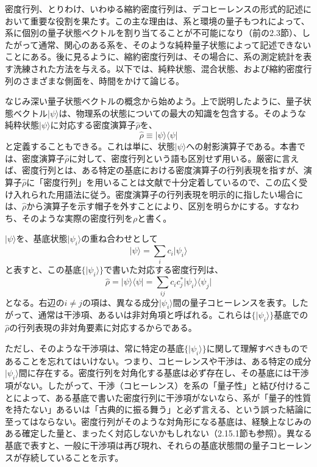 密度行列、とりわけ、いわゆる縮約密度行列は、デコヒーレンスの形式的記述において重要な役割を果たす。この主な理由は、系と環境の量子もつれによって、系に個別の量子状態ベクトルを割り当てることが不可能になり（前の2.3節）、したがって通常、関心のある系を、そのような純粋量子状態によって記述できないことにある。後に見るように、縮約密度行列は、その場合に、系の測定統計を表す洗練された方法を与える。以下では、純粋状態、混合状態、および縮約密度行列のさまざまな側面を、時間をかけて論じる。

\hypertarget{srcpage:34}{}\label{srcpage:34}
なじみ深い量子状態ベクトルの概念から始めよう。上で説明したように、量子状態ベクトル$\lvert\psi\rangle$は、物理系の状態についての最大の知識を包含する。そのような純粋状態$\lvert\psi\rangle$に対応する密度演算子$\hat\rho$を、
\begin{equation}\hat\rho\equiv\lvert\psi\rangle\langle\psi\rvert\tag{2.11}\end{equation}
と定義することもできる。これは単に、状態$\lvert\psi\rangle$への射影演算子である。本書では、密度演算子$\hat\rho$に対して、密度行列という語も区別せず用いる。厳密に言えば、密度行列とは、ある特定の基底における密度演算子の行列表現を指すが、演算子$\hat\rho$に「密度行列」を用いることは文献で十分定着しているので、この広く受け入れられた用語法に従う。密度演算子の行列表現を明示的に指したい場合には、$\hat\rho$から演算子を示す帽子を外すことにより、区別を明らかにする。すなわち、そのような実際の密度行列を$\rho$と書く。

$\lvert\psi\rangle$を、基底状態$\lvert\psi_i\rangle$の重ね合わせとして
\begin{equation}\lvert\psi\rangle=\sum_i c_i\lvert\psi_i\rangle\tag{2.12}\end{equation}
と表すと、この基底$\{\lvert\psi_i\rangle\}$で書いた対応する密度行列は、
\begin{equation}\hat\rho=\lvert\psi\rangle\langle\psi\rvert=\sum_{ij}c_ic_j^*\lvert\psi_i\rangle\langle\psi_j\rvert\tag{2.13}\end{equation}
となる。右辺の$i\ne j$の項は、異なる成分$\lvert\psi_i\rangle$間の量子コヒーレンスを表す。したがって、通常は干渉項、あるいは非対角項と呼ばれる。これらは$\{\lvert\psi_i\rangle\}$基底での$\hat\rho$の行列表現の非対角要素に対応するからである。

ただし、そのような干渉項は、常に特定の基底$\{\lvert\psi_i\rangle\}$に関して理解すべきものであることを忘れてはいけない。つまり、コヒーレンスや干渉は、ある特定の成分$\lvert\psi_i\rangle$間に存在する。密度行列を対角化する基底は必ず存在し、その基底には干渉項がない。したがって、干渉（コヒーレンス）を系の「量子性」と結び付けることによって、ある基底で書いた密度行列に干渉項がないなら、系が「量子的性質を持たない」あるいは「古典的に振る舞う」と必ず言える、という誤った結論に至ってはならない。密度行列がそのような対角形になる基底は、経験上なじみのある確定した量と、まったく対応しないかもしれない（2.15.1節も参照）。異なる基底で表すと、一般に干渉項は再び現れ、それらの基底状態間の量子コヒーレンスが存続していることを示す。

